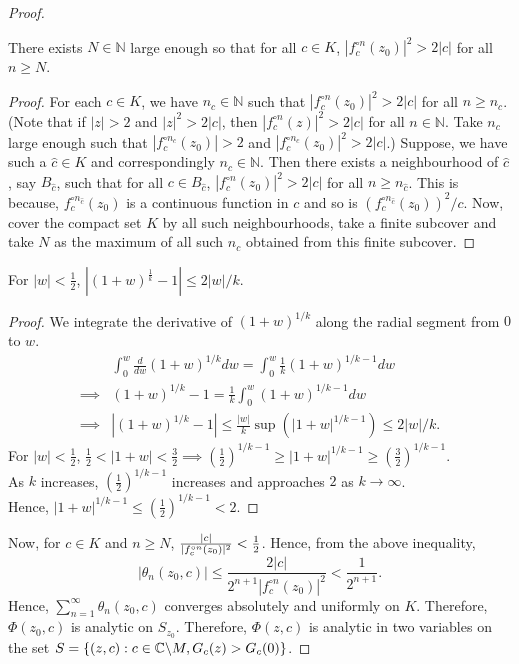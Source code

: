 \begin{proof}
\begin{claim}
	There exists \( N\in \mathbb{N} \) large enough so that 
	for all \( c\in K \), \( |f_c^{\circ n}(z_0)|^2>2|c| \)
	for all \( n\ge  N \). 
\end{claim}
\begin{proof}
For each \( c\in K \), we have \( n_c \in \mathbb{N} \) such that \( |f_c^{\circ n}(z_0)|^2>2|c| \) for all \( n\ge n_c \).
(Note that if \( |z|>2 \) and \(|z|^2>2|c|  \), then \( |f_c^{\circ n}(z)|^2 > 2|c| \) for all \( n\in \mathbb{N} \). Take \( n_c \)
large enough such that \( | f_c^{\circ n_c}(z_0)| > 2 \) and \( |f_c^{\circ n_c}(z_0)|^2 > 2|c| \).)
Suppose, we have such a \( \hat{c}\in K  \) and correspondingly \( n_{\hat{c}}\in \mathbb{N} \). Then there exists
a neighbourhood of \( \hat{c} \), say \( B_{\hat{c}} \),
such that for all \( c\in B_{\hat{c}}\), \( |f_c^{\circ n}(z_0)|^2>2|c| \) for all \( n\ge n_{\hat{c}} \). This is because, \( f_c^{\circ n_{\hat{c}}}(z_0) \)
is a continuous function in \( c \) and so is \( (f_c^{\circ n_{\hat{c}}}(z_0))^2 /c \). Now, cover the compact set \( K \) by 
all such neighbourhoods, take a finite subcover and take \( N \) as the maximum
of all such \( n_c \) obtained from this finite subcover.
\end{proof}

\begin{claim}
	For \( |w|<\frac{1}{2} \), \( |(1+w)^{\frac{1}{k}} -1|\le 2|w|/k \).
\end{claim}
\begin{proof}
	We integrate the derivative of \( (1+w)^{1/k} \) along the radial segment from \( 0 \) to \( w \).
	\begin{align*}
		&\int_0^w \frac{d}{dw}(1+w)^{1/k} dw = \int_0^w\frac{1}{k}(1+w)^{1/k-1} dw\\
		\implies& (1+w)^{1/k}-1=\frac{1}{k}\int_0^w (1+w)^{1/k-1} dw\\
		\implies& |(1+w)^{1/k}-1|\le \frac{|w|}{k} \sup(|1+w|^{1/k-1})\le 2|w|/k 
	.\end{align*}
	For \( |w|<\frac{1}{2} \), \( \frac{1}{2}<|1+w|<\frac{3}{2}\implies (\frac{1}{2})^{1/k-1}\ge |1+w|^{1/k-1} \ge (\frac{3}{2})^{1/k-1} \).\\
		As \( k \) increases, \( (\frac{1}{2})^{1/k-1} \) increases and approaches \( 2 \) as \( k\to \infty \).\\
		Hence, \( |1+w|^{1/k-1} \le (\frac{1}{2})^{1/k-1}<2 \).
\end{proof}

Now, for \( c\in K \) and \( n\ge N \), \( \frac{|c|}{|\fcof[n](z_0)|^2}<\frac{1}{2} \). Hence, from the above inequality, \[
	|\theta _n(z_0,c)|\le \frac{2|c|}{2^{n+1}|f_c^{\circ n}(z_0)|^2}<\frac{1}{2^{n+1}}
.\] 
Hence, \( \sum_{n=1}^{\infty}\theta _n(z_0,c)  \) converges absolutely and uniformly on \( K \). Therefore, \( \Phi(z_0,c) \)
is analytic on \( S_{z_0} \).
Therefore, \( \Phi(z,c) \) is analytic in two variables on the set \( S=\{(z,c):c\in \mathbb{C}\backslash M, G_c(z)>G_c(0)\} \).


\end{proof}
